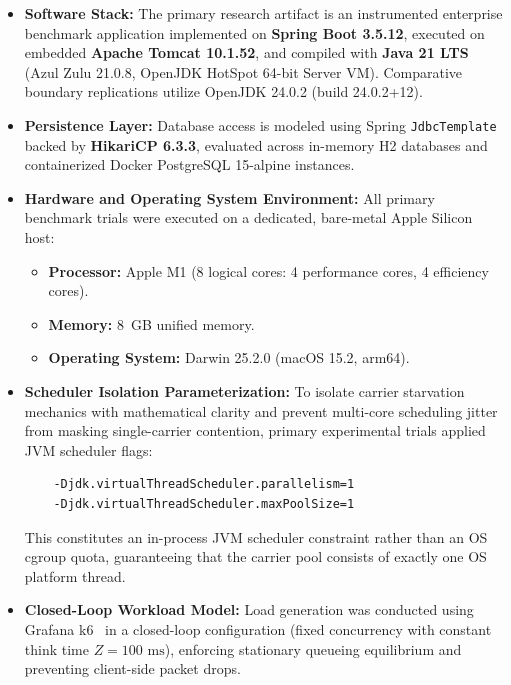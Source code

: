 \begin{itemize}
  \item \textbf{Software Stack:} The primary research artifact is an instrumented enterprise benchmark application implemented on \textbf{Spring Boot 3.5.12}, executed on embedded \textbf{Apache Tomcat 10.1.52}, and compiled with \textbf{Java 21 LTS} (Azul Zulu 21.0.8, OpenJDK HotSpot 64-bit Server VM). Comparative boundary replications utilize OpenJDK 24.0.2 (build 24.0.2+12).
  \item \textbf{Persistence Layer:} Database access is modeled using Spring \texttt{JdbcTemplate} backed by \textbf{HikariCP 6.3.3}, evaluated across in-memory H2 databases and containerized Docker PostgreSQL 15-alpine instances.
  \item \textbf{Hardware and Operating System Environment:} All primary benchmark trials were executed on a dedicated, bare-metal Apple Silicon host:
    \begin{itemize}
      \item \textbf{Processor:} Apple M1 (8 logical cores: 4 performance cores, 4 efficiency cores).
      \item \textbf{Memory:} 8~GB unified memory.
      \item \textbf{Operating System:} Darwin 25.2.0 (macOS 15.2, arm64).
    \end{itemize}
  \item \textbf{Scheduler Isolation Parameterization:} To isolate carrier starvation mechanics with mathematical clarity and prevent multi-core scheduling jitter from masking single-carrier contention, primary experimental trials applied JVM scheduler flags:
    \begin{verbatim}
    -Djdk.virtualThreadScheduler.parallelism=1
    -Djdk.virtualThreadScheduler.maxPoolSize=1
    \end{verbatim}
    This constitutes an in-process JVM scheduler constraint rather than an OS cgroup quota, guaranteeing that the carrier pool consists of exactly one OS platform thread.
  \item \textbf{Closed-Loop Workload Model:} Load generation was conducted using Grafana k6~\cite{GrafanaK6} in a closed-loop configuration (fixed concurrency with constant think time $Z = 100\text{ ms}$), enforcing stationary queueing equilibrium and preventing client-side packet drops.
\end{itemize}

